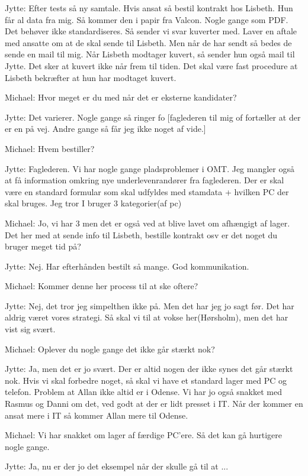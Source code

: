 Jytte:
Efter tests så ny samtale. Hvis ansat så bestil kontrakt hos Lisbeth.
Hun får al data fra mig.
Så kommer den i papir fra Valcon. Nogle gange som PDF.
Det behøver ikke standardiseres. 
Så sender vi svar kuverter med. Laver en aftale med ansatte
om at de skal sende til Lisbeth.
Men når de har sendt så bedes de sende en mail til mig. 
Når Lisbeth modtager kuvert, så sender hun også mail til Jytte.
Det sker at kuvert ikke når frem til tiden.
Det skal være fast procedure at Lisbeth bekræfter at hun har modtaget kuvert.

Michael:
Hvor meget er du med når det er eksterne kandidater?

Jytte:
Det varierer. Nogle gange så ringer fo
[faglederen til mig of fortæller at der er en på vej. 
Andre gange så får jeg ikke noget af vide.]

Michael:
Hvem bestiller?

Jytte:
Faglederen. Vi har nogle gange pladsproblemer i OMT.
Jeg mangler også at få information omkring nye underlevenrandører fra faglederen. 
Der er skal være en standard formular som skal udfyldes med stamdata
+ hvilken PC der skal bruges. 
Jeg tror I bruger 3 kategorier(af pc)

Michael:
Jo, vi har 3 men det er også ved at blive lavet om afhængigt af lager.
Det her med at sende info til Lisbeth,
bestille kontrakt osv er det noget du bruger meget tid på?

Jytte:
Nej. Har efterhånden bestilt så mange. God kommunikation.

Michael:
Kommer denne her process til at ske oftere?

Jytte:
Nej, det tror jeg simpelthen ikke på. Men det har jeg jo sagt før.
Det har aldrig været vores strategi.
Så skal vi til at vokse her(Hørsholm), men det har vist sig svært.

Michael:
Oplever du nogle gange det ikke går stærkt nok?

Jytte:
Ja, men det er jo svært. Der er altid nogen der ikke synes det går stærkt nok.
Hvis vi skal forbedre noget, så skal vi have et standard lager med PC og telefon.
Problem at Allan ikke altid er i Odense.
Vi har jo også snakket med Rasmus og Danni om det, ved godt at der er lidt presset i IT.
Når der kommer en ansat mere i IT så kommer Allan mere til Odense.

Michael:
Vi har snakket om lager af færdige PC’ere. Så det kan gå hurtigere nogle gange.

Jytte:
Ja, nu er der jo det eksempel når der skulle gå til at ...

